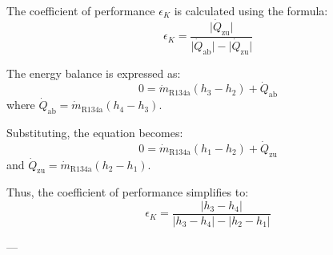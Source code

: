 The coefficient of performance \( \epsilon_K \) is calculated using the formula:  
\[
\epsilon_K = \frac{\lvert \dot{Q}_{\text{zu}} \rvert}{\lvert \dot{Q}_{\text{ab}} \rvert - \lvert \dot{Q}_{\text{zu}} \rvert}
\]  

The energy balance is expressed as:  
\[
0 = \dot{m}_{\text{R134a}} (h_3 - h_2) + \dot{Q}_{\text{ab}}
\]  
where \( \dot{Q}_{\text{ab}} = \dot{m}_{\text{R134a}} (h_4 - h_3) \).  

Substituting, the equation becomes:  
\[
0 = \dot{m}_{\text{R134a}} (h_1 - h_2) + \dot{Q}_{\text{zu}}
\]  
and \( \dot{Q}_{\text{zu}} = \dot{m}_{\text{R134a}} (h_2 - h_1) \).  

Thus, the coefficient of performance simplifies to:  
\[
\epsilon_K = \frac{\lvert h_3 - h_4 \rvert}{\lvert h_3 - h_4 \rvert - \lvert h_2 - h_1 \rvert}
\]  

---